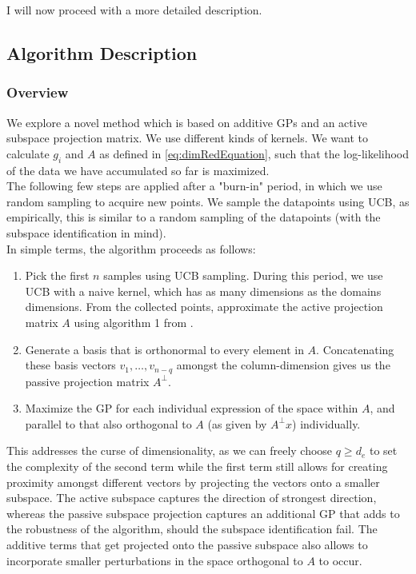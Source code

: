 I will now proceed with a more detailed description.

\subsection{Algorithm Description}

\subsubsection{Overview}

We explore a novel method which is based on additive GPs and an active subspace projection matrix.
We use different kinds of kernels.
We want to calculate $g_i$ and $A$ as defined in \ref{eq:dimRedEquation}, such that the log-likelihood of the data we have accumulated so far is maximized.\\
 
 The following few steps are applied after a "burn-in" period, in which we use random sampling to acquire new points.
 We sample the datapoints using UCB, as empirically, this is similar to a random sampling of the datapoints (with the subspace identification in mind).\\
 
 In simple terms, the algorithm proceeds as follows:
 
 \begin{enumerate}
 \item Pick the first $n$ samples using UCB sampling.
 During this period, we use UCB with a naive kernel, which has as many dimensions as the domains dimensions.
 From the collected points, approximate the active projection matrix $A$ using algorithm 1 from \citep{Tripathy}.
 \item Generate a basis that is orthonormal to every element in $A$.
 Concatenating these basis vectors $v_1, \ldots, v_{n-{q}}$ amongst the column-dimension gives us the passive projection matrix $A^\bot$.
 \item Maximize the GP for each individual expression of the space within $A$, and parallel to that also orthogonal to $A$ (as given by $A^\bot x$) individually. 
 \end{enumerate}
 
 This addresses the curse of dimensionality, as we can freely choose $q \geq d_e$ to set the complexity of the second term while the first term still allows for creating proximity amongst different vectors by projecting the vectors onto a smaller subspace.
The active subspace captures the direction of strongest direction, whereas the passive subspace projection captures an additional GP that adds to the robustness of the algorithm, should the subspace identification fail.
The additive terms that get projected onto the passive subspace also allows to incorporate smaller perturbations in the space orthogonal to $A$ to occur.

